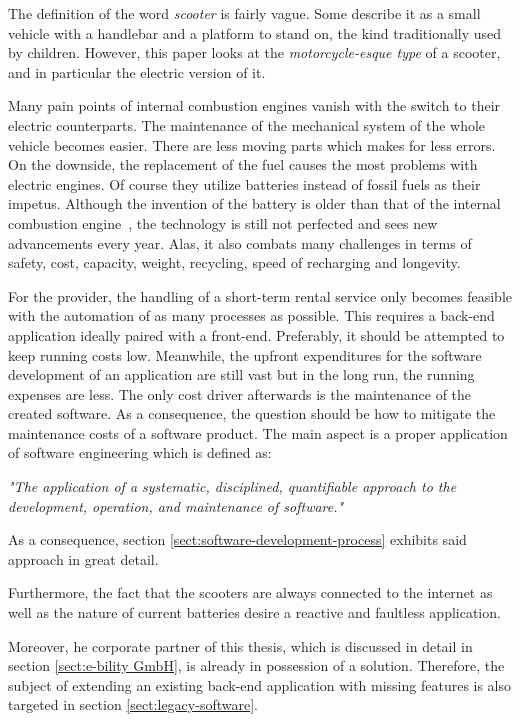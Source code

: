 \documentclass[12pt,a4paper,twoside]{report}
\begin{document}
The definition of the word \emph{scooter} is fairly vague.
Some describe it as a small vehicle with a handlebar and a platform to stand on,
the kind traditionally used by children.
However, this paper looks at the \emph{motorcycle-esque type} of a scooter, and in
particular the electric version of it.

Many pain points of internal combustion engines vanish with the switch to their electric
counterparts. The maintenance of the mechanical system of the whole vehicle becomes easier.
There are less moving parts which makes for less errors.
On the downside, the replacement of the fuel causes the most problems with electric engines.
Of course they utilize batteries instead of fossil fuels as their impetus.
Although the invention of the battery is older than that of the
internal combustion engine~\cite{battery, combustion-engine}, the technology is still not perfected and sees new
advancements every year. Alas, it also combats many challenges in terms of
safety, cost, capacity, weight, recycling, speed of recharging and longevity.

For the provider, the handling of a short-term rental service
only becomes feasible with the automation of as many processes as possible.
This requires a back-end application ideally paired with a front-end.
Preferably, it should be attempted to keep running costs low.
Meanwhile, the upfront expenditures for the software development of
an application are still vast but in the long run, the running expenses are less.
The only cost driver afterwards is the maintenance of the created software.
As a consequence, the question should be how to mitigate the maintenance costs
of a software product. The main aspect is a proper application of
software engineering which is defined as:
\begin{displayquote}
\emph{"The application of a systematic, disciplined, quantifiable approach to the
development, operation, and maintenance of software."}~\cite{se-ieee}
\end{displayquote}
As a consequence, section \ref{sect:software-development-process} exhibits
said approach in great detail.

Furthermore, the fact that the scooters are always connected to the internet
as well as the nature of current batteries desire a reactive and faultless application.

Moreover, he corporate partner of this thesis, which is discussed in detail
in section \ref{sect:e-bility GmbH}, is already in possession of a solution.
Therefore, the subject of extending an existing back-end application
with missing features is also targeted in section \ref{sect:legacy-software}.
\end{document}
